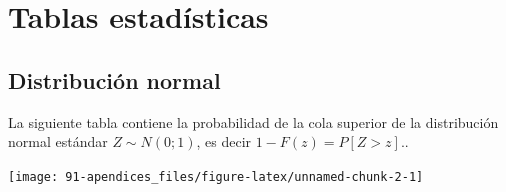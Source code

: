 \documentclass[
]{book}
\begin{document}
\hypertarget{ap:tablas}{%
\chapter{Tablas estadísticas}\label{ap:tablas}}

\hypertarget{distribuciuxf3n-normal}{%
\section{Distribución normal}\label{distribuciuxf3n-normal}}

La siguiente tabla contiene la probabilidad de la cola superior de la distribución normal estándar \(Z\sim N(0;1)\),
es decir \(1-F(z)=P[Z>z].\).

\texttt{[image: 91-apendices\_files/figure-latex/unnamed-chunk-2-1]}
\end{document}
